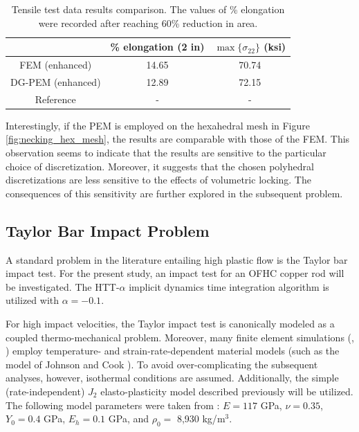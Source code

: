 \begin{table}
\centering
\begin{tabular}{| c || c | c |}
    \hline
               & \% elongation (2 in) & $\max\{\sigma_{22}\}$ (ksi) \\ \hline \hline
    FEM (enhanced)    & 14.65 & 70.74 \\ \hline
    DG-PEM (enhanced) & 12.89 & 72.15 \\ \hline
    Reference         & - & - \\
    \hline
\end{tabular}
\caption{Tensile test data results comparison. The values of \% elongation were recorded after reaching 60\% reduction in area.}
\label{tab:tensile_test_data_results}
\end{table}

Interestingly, if the PEM is employed on the hexahedral mesh in Figure \ref{fig:necking_hex_mesh}, the results are comparable with those of the FEM. This observation seems to indicate that the results are sensitive to the particular choice of discretization. Moreover, it suggests that the chosen polyhedral discretizations are less sensitive to the effects of volumetric locking. The consequences of this sensitivity are further explored in the subsequent problem.

\subsection*{Taylor Bar Impact Problem}

A standard problem in the literature entailing high plastic flow is the Taylor bar impact test. For the present study, an impact test for an OFHC copper rod will be investigated. The HTT-$\alpha$ implicit dynamics time integration algorithm \cite{Hilber&Hughes&Taylor:77} is utilized with $\alpha = -0.1$.

For high impact velocities, the Taylor impact test is canonically modeled as a coupled thermo-mechanical problem. Moreover, many finite element simulations (\cite{Heinstein:05}, \cite{Banerjee:05}) employ temperature- and strain-rate-dependent material models (such as the model of Johnson and Cook \cite{Johnson&Cook:83}). To avoid over-complicating the subsequent analyses, however, isothermal conditions are assumed. Additionally, the simple (rate-independent) $J_2$ elasto-plasticity model described previously will be utilized. The following model parameters were taken from \cite{Erhart:11}: $E = 117$ GPa, $\nu = 0.35$, $Y_0 = 0.4$ GPa, $E_h = 0.1$ GPa, and $\rho_0=$ 8,930 kg/$\text{m}^3$.

